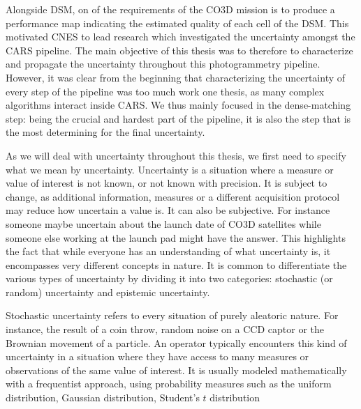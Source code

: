 Alongside DSM, on of the requirements of the CO3D mission is to produce a performance map indicating the estimated quality of each cell of the DSM. This motivated CNES to lead research which investigated the uncertainty amongst the CARS pipeline. The main objective of this thesis was to therefore to characterize and propagate the uncertainty throughout this photogrammetry pipeline. However, it was clear from the beginning that characterizing the uncertainty of every step of the pipeline was too much work one thesis, as many complex algorithms interact inside CARS. We thus mainly focused in the dense-matching step: being the crucial and hardest part of the pipeline, it is also the step that is the most determining for the final uncertainty.

As we will deal with uncertainty throughout this thesis, we first need to specify what we mean by uncertainty. Uncertainty is a situation where a measure or value of interest is not known, or not known with precision. It is subject to change, as additional information, measures or a different acquisition protocol may reduce how uncertain a value is. It can also be subjective. For instance someone maybe uncertain about the launch date of CO3D satellites while someone else working at the launch pad might have the answer. This highlights the fact that while everyone has an understanding of what uncertainty is, it encompasses very different concepts in nature. It is common to differentiate the various types of uncertainty by dividing it into two categories: stochastic (or random) uncertainty and epistemic uncertainty.

Stochastic uncertainty refers to every situation of purely aleatoric nature. For instance, the result of a coin throw, random noise on a CCD captor or the Brownian movement of a particle. An operator typically encounters this kind of uncertainty in a situation where they have access to many measures or observations of the same value of interest. It is usually modeled mathematically with a frequentist approach, using probability measures such as the uniform distribution, Gaussian distribution, Student's $t$ distribution \etc 

